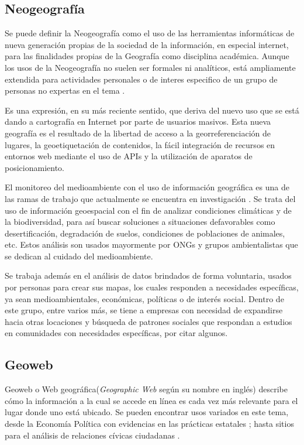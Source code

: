 \documentclass{llncs}
\begin{document}
\subsection{Neogeografía}\label{sec:neogeo}

Se puede definir la Neogeografía como el uso de las herramientas informáticas
de nueva generación propias de la sociedad de la información, en especial
internet, para las finalidades propias de la Geografía como disciplina
académica. Aunque los usos de la Neogeografía no suelen ser formales ni
analíticos, está ampliamente extendida para actividades personales o de
interes especifico de un grupo de personas no expertas en el tema 
\cite{turner2006}.

Es una expresión, en su más reciente sentido, que deriva del nuevo uso que
se está dando a cartografía en Internet por parte de usuarios masivos. Esta
nueva geografía es el resultado de la libertad de acceso a la
georreferenciación de lugares, la geoetiquetación de contenidos, la fácil
integración de recursos en entornos web mediante el uso de APIs y la
utilización  de aparatos de posicionamiento.

El monitoreo del medioambiente con el uso de información geográfica es una de
las ramas de trabajo que actualmente se encuentra en investigación
\cite{connors2012}. Se trata del uso de información geoespacial con el fin de
analizar condiciones climáticas y de la biodiversidad, para así buscar
soluciones a situaciones defavorables como desertificación, degradación de
suelos, condiciones de poblaciones de animales, etc. Estos análisis son usados
mayormente por ONGs y grupos ambientalistas que se dedican al cuidado del
medioambiente.

Se trabaja además en el análisis de datos brindados de forma voluntaria,
usados por personas para crear sus mapas, los cuales responden a necesidades
específicas, ya sean medioambientales, económicas, políticas o de interés
social\cite{harris2012}. Dentro de este grupo, entre varios más, se tiene a
empresas con necesidad de expandirse hacia otras locaciones y búsqueda de
patrones sociales que respondan a estudios en comunidades con necesidades
específicas, por citar algunos.

\subsection{Geoweb}\label{sec:geoweb}

Geoweb o Web geográfica(\emph{Geographic Web} según su nombre en inglés)
describe cómo la información a la cual se accede en línea es cada vez más
relevante para el lugar donde uno está ubicado. Se pueden encontrar usos
variados en este tema, desde la Economía Política con evidencias en las
prácticas estatales \cite{leszczynski2012}; hasta sitios para el análisis
de relaciones cívicas ciudadanas \cite{johnson2015}.
\end{document}

